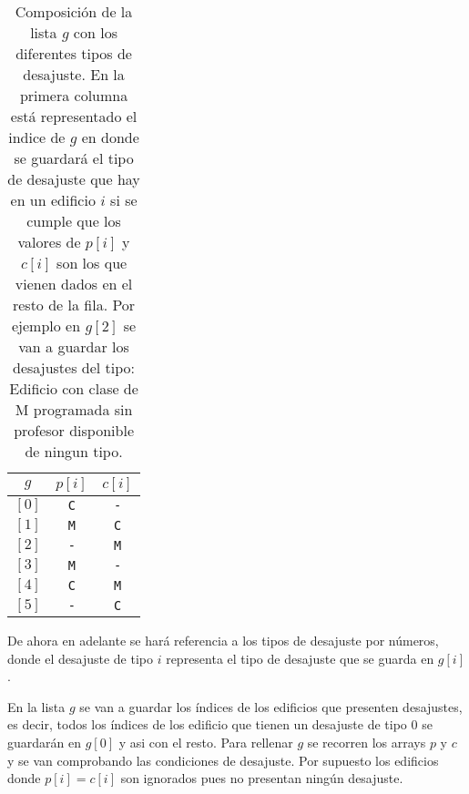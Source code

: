 \documentclass[11pt]{article}
\begin{document}
    \begin{table}[h]
        \centering
        \label{Tabla_de_Desajustes}
        \begin{tabular}{|c|c|c|}
            \hline \textbf{$g$} & \textbf{$p[i]$} & \textbf{$c[i]$}\\ 
            \hline $[0]$ & \texttt{C} & \texttt{-} \\
            \hline $[1]$ & \texttt{M} & \texttt{C} \\
            \hline $[2]$ & \texttt{-} & \texttt{M} \\
            \hline $[3]$ & \texttt{M} & \texttt{-} \\
            \hline $[4]$ & \texttt{C} & \texttt{M} \\
            \hline $[5]$ & \texttt{-} & \texttt{C} \\
            \hline
        \end{tabular}
        \caption{Composición de la lista $g$ con los diferentes tipos de desajuste. En la primera columna está
        representado el indice de $g$ en donde se guardará el tipo de desajuste que hay en un edificio $i$ si se
        cumple que los valores de $p[i]$ y $c[i]$ son los que vienen dados en el resto de la fila. Por ejemplo en
        $g[2]$ se van a guardar los desajustes del tipo: Edificio con clase de M programada sin profesor
        disponible de ningun tipo.}
    \end{table}

    De ahora en adelante se hará referencia a los tipos de desajuste por números, donde el desajuste de tipo $i$
    representa el tipo de desajuste que se guarda en $g[i]$.

    En la lista $g$ se van a guardar los índices de los edificios que presenten desajustes, es decir, todos los
    índices de los edificio que tienen un desajuste de tipo 0 se guardarán en $g[0]$ y asi con el resto. Para
    rellenar $g$ se recorren los arrays $p$ y $c$ y se van comprobando las condiciones de desajuste. Por supuesto
    los edificios donde $p[i] = c[i]$ son ignorados pues no presentan ningún desajuste.
\end{document}
